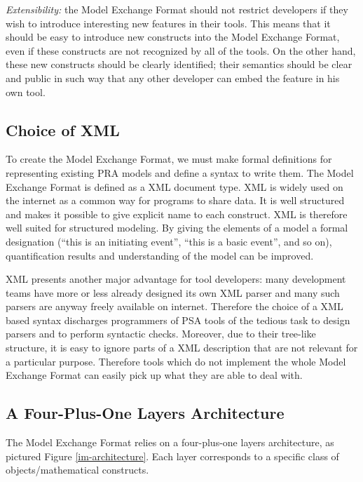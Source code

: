 \documentclass[11pt]{article}
\begin{document}
\emph{Extensibility:} the Model Exchange Format should not restrict
developers if they wish to introduce interesting new features in their
tools. This means that it should be easy to introduce new constructs
into the Model Exchange Format, even if these constructs are not
recognized by all of the tools. On the other hand, these new constructs
should be clearly identified; their semantics should be clear and public
in such way that any other developer can embed the feature in his own
tool.

\subsection{Choice of XML}
\label{sec:org23b40fe}

To create the Model Exchange Format, we must make formal definitions for
representing existing PRA models and define a syntax to write them. The
Model Exchange Format is defined as a XML document type. XML is widely
used on the internet as a common way for programs to share data. It is
well structured and makes it possible to give explicit name to each
construct. XML is therefore well suited for structured modeling. By
giving the elements of a model a formal designation (``this is an
initiating event'', ``this is a basic event'', and so on), quantification
results and understanding of the model can be improved.

XML presents another major advantage for tool developers: many
development teams have more or less already designed its own XML parser
and many such parsers are anyway freely available on internet. Therefore
the choice of a XML based syntax discharges programmers of PSA tools of
the tedious task to design parsers and to perform syntactic checks.
Moreover, due to their tree-like structure, it is easy to ignore parts
of a XML description that are not relevant for a particular purpose.
Therefore tools which do not implement the whole Model Exchange Format
can easily pick up what they are able to deal with.

\subsection{A Four-Plus-One Layers Architecture}
\label{sec:orgcf1c2cb}

The Model Exchange Format relies on a four-plus-one layers architecture,
as pictured Figure \ref{im-architecture}. Each layer corresponds to a specific class of
objects/mathematical constructs.
\end{document}
